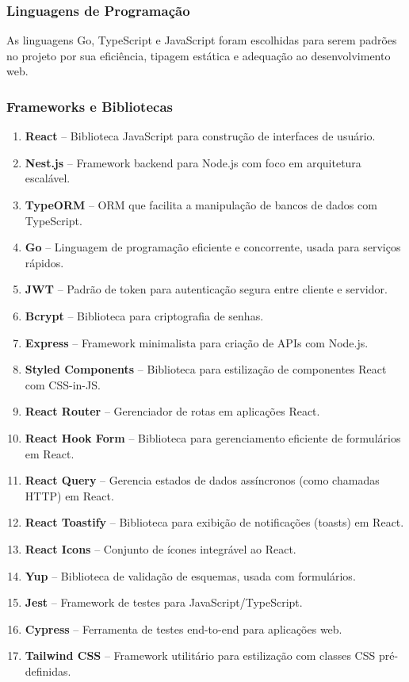 \documentclass[12pt, a4paper]{article}
\begin{document}
\begin{spacing}{1.5}
\subsubsection{Linguagens de Programação}
As linguagens Go, TypeScript e JavaScript foram escolhidas para serem padrões no projeto por sua eficiência, tipagem estática e adequação ao desenvolvimento web.


\subsubsection{Frameworks e Bibliotecas}
\begin{enumerate}[label=\alph*)]
\item \textbf{React} – Biblioteca JavaScript para construção de interfaces de usuário.
\item \textbf{Nest.js} – Framework backend para Node.js com foco em arquitetura escalável.
\item \textbf{TypeORM} – ORM que facilita a manipulação de bancos de dados com TypeScript.
\item \textbf{Go} – Linguagem de programação eficiente e concorrente, usada para serviços rápidos.
\item \textbf{JWT} – Padrão de token para autenticação segura entre cliente e servidor.
\item \textbf{Bcrypt} – Biblioteca para criptografia de senhas.
\item \textbf{Express} – Framework minimalista para criação de APIs com Node.js.
\item \textbf{Styled Components} – Biblioteca para estilização de componentes React com CSS-in-JS.
\item \textbf{React Router} – Gerenciador de rotas em aplicações React.
\item \textbf{React Hook Form} – Biblioteca para gerenciamento eficiente de formulários em React.
\item \textbf{React Query} – Gerencia estados de dados assíncronos (como chamadas HTTP) em React.
\item \textbf{React Toastify} – Biblioteca para exibição de notificações (toasts) em React.
\item \textbf{React Icons} – Conjunto de ícones integrável ao React.
\item \textbf{Yup} – Biblioteca de validação de esquemas, usada com formulários.
\item \textbf{Jest} – Framework de testes para JavaScript/TypeScript.
\item \textbf{Cypress} – Ferramenta de testes end-to-end para aplicações web.
\item \textbf{Tailwind CSS} – Framework utilitário para estilização com classes CSS pré-definidas.
\end{enumerate}




\end{spacing}
\end{document}
